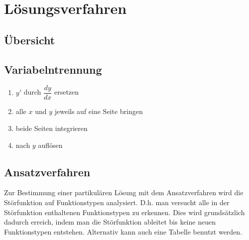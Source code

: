 \section{Lösungsverfahren}

\subsection{Übersicht}
\begin{footnotesize}
\end{footnotesize}

\subsection{Variabelntrennung}
\begin{enumerate}
  \item $y'$ durch $\dfrac{dy}{dx}$ ersetzen
  \item alle $x$ und $y$ jeweils auf eine Seite bringen
  \item beide Seiten integrieren
  \item nach $y$ auflösen
\end{enumerate}

\subsection{Ansatzverfahren}
Zur Bestimmung einer partikulären Lösung mit dem Ansatzverfahren wird die 
Störfunktion auf Funktionstypen analysiert. D.h. man versucht alle in der
Störfunktion enthaltenen Funktionstypen zu erkennen. Dies wird grundsätzlich
dadurch erreich, indem man die Störfunktion ableitet bis keine neuen 
Funktionstypen entstehen. Alternativ kann auch eine Tabelle benutzt werden.
\footnotesize

\normalsize

